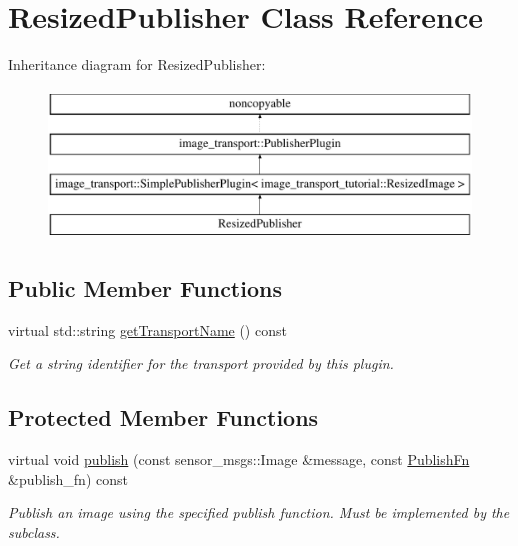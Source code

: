 \hypertarget{class_resized_publisher}{\section{Resized\-Publisher Class Reference}
\label{class_resized_publisher}
}
Inheritance diagram for Resized\-Publisher\-:\begin{figure}[H]
\begin{center}
\leavevmode
\includegraphics[height=4.000000cm]{class_resized_publisher}
\end{center}
\end{figure}
\subsection*{Public Member Functions}
\begin{DoxyCompactItemize}
\item 
\hypertarget{class_resized_publisher_a2282c668269cc359be3f1767fa31c1cc}{virtual std\-::string \hyperlink{class_resized_publisher_a2282c668269cc359be3f1767fa31c1cc}{get\-Transport\-Name} () const }\label{class_resized_publisher_a2282c668269cc359be3f1767fa31c1cc}

\begin{DoxyCompactList}\small\item\em Get a string identifier for the transport provided by this plugin. \end{DoxyCompactList}\end{DoxyCompactItemize}
\subsection*{Protected Member Functions}
\begin{DoxyCompactItemize}
\item 
virtual void \hyperlink{class_resized_publisher_af0121f511226071f7cb96fb3e50879a6}{publish} (const sensor\-\_\-msgs\-::\-Image \&message, const \hyperlink{classimage__transport_1_1_simple_publisher_plugin_a01bd11cb3ee6b7ce6715a3b57feadf93}{Publish\-Fn} \&publish\-\_\-fn) const 
\begin{DoxyCompactList}\small\item\em Publish an image using the specified publish function. Must be implemented by the subclass. \end{DoxyCompactList}\end{DoxyCompactItemize}
